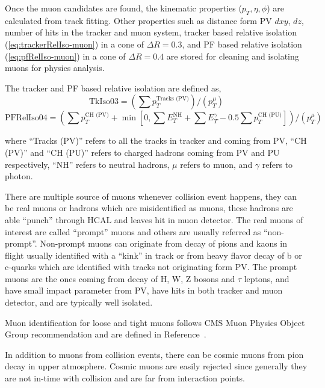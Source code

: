 Once the muon candidates are found,
the kinematic properties (\( p_T, \eta, \phi \))
are calculated from track fitting. Other properties such as distance form
\gls{PV} \( dxy \), \( dz \), number of hits in the tracker and muon system, tracker
based relative isolation (\ref{eq:trackerRelIso-muon}) in a cone of \( \Delta R = 0.3 \), and
\gls{PF} based relative isolation (\ref{eq:pfRelIso-muon})
in a cone of \( \Delta R = 0.4 \) are stored for cleaning and isolating muons for
physics analysis.

The tracker and \gls{PF} based relative isolation are defined as,
%
\begin{equation}\label{eq:trackerRelIso-muon}
  \text{TkIso03} = \left( \sum p_{T}^{\text{Tracks (PV)}} \right) /
  \left( p_{T}^{\mu} \right)
\end{equation}
%
\begin{equation}\label{eq:pfRelIso-muon}
  \text{PFRelIso04} = \left( \sum p_{T}^{\text{CH (PV)}}
  + \min \left[ 0, \sum E_{T}^{\text{NH}} + \sum E_{T}^{\gamma}
    - 0.5 \sum p_{T}^{\text{CH (PU)}} \right] \right) /
  \left( p_{T}^{\mu} \right)
\end{equation}

where ``Tracks (PV)'' refers to all the tracks in tracker and coming from \gls{PV},
``CH (PV)'' and ``CH (PU)'' refers to charged hadrons coming from \gls{PV} and \gls{PU}
respectively, ``NH'' refers to neutral hadrons, \( \mu \) refers to muon, and
\( \gamma \) refers to photon.

There are multiple source of muons whenever collision event happens, they can be
real muons or hadrons which are misidentified as muons, these hadrons
are able ``punch'' through \gls{HCAL} and leaves hit in muon detector. The real
muons of interest are called ``prompt'' muons and others are usually referred
as ``non-prompt''. Non-prompt muons can originate from decay of pions and kaons in flight
usually identified with a ``kink'' in track or from heavy flavor decay of b or c-quarks
which are identified with tracks not originating form \gls{PV}.
The prompt muons are the ones coming from decay of H, W, Z bosons and \( \tau \) leptons,
and have small impact parameter from \gls{PV}, have hits in both tracker
and muon detector, and are typically well isolated.

Muon identification for loose and tight muons
follows \gls{CMS} Muon Physics Object Group
recommendation and are defined in Reference~\cite{cms-muon-id}.

In addition to muons from collision events, there can be cosmic muons from pion decay in
upper atmosphere. Cosmic muons are easily
rejected since generally they are not in-time with collision and are far from
interaction points.

